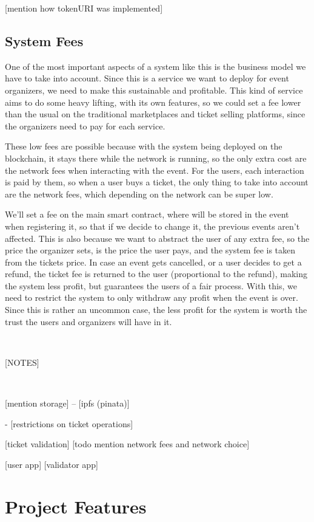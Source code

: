     [mention how tokenURI was implemented]

\subsection{System Fees}
\label{subsec:system_fees}

One of the most important aspects of a system like this is the business model we have to take into account. Since this is a service we want to deploy for event organizers, we need to make this sustainable and profitable. This kind of service aims to do some heavy lifting, with its own features, so we could set a fee lower than the usual on the traditional marketplaces and ticket selling platforms, since the organizers need to pay for each service.

These low fees are possible because with the system being deployed on the blockchain, it stays there while the network is running, so the only extra cost are the network fees when interacting with the event. For the users, each interaction is paid by them, so when a user buys a ticket, the only thing to take into account are the network fees, which depending on the network can be super low.

We'll set a fee on the main smart contract, where will be stored in the event when registering it, so that if we decide to change it, the previous events aren't affected. This is also because we want to abstract the user of any extra fee, so the price the organizer sets, is the price the user pays, and the system fee is taken from the tickets price. In case an event gets cancelled, or a user decides to get a refund, the ticket fee is returned to the user (proportional to the refund), making the system less profit, but guarantees the users of a fair process. With this, we need to restrict the system to only withdraw any profit when the event is over. Since this is rather an uncommon case, the less profit for the system is worth the trust the users and organizers will have in it.

~

[NOTES]

~

[mention storage]
-- [ipfs (pinata)]

- [restrictions on ticket operations]

[ticket validation]
[todo mention network fees and network choice]

[user app]
[validator app]

\section{Project Features}
\label{sec:project_features}
